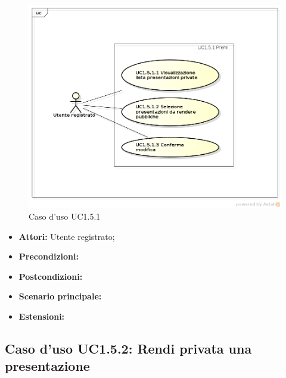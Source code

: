 \begin{figure}[h]
	\begin{center}
	\includegraphics[scale=0.4]{diagram/UC1-5-1.png}
	\caption{Caso d'uso UC1.5.1}
	\end{center}
\end{figure}

\begin{itemize}
	\item \textbf{Attori:} Utente registrato; 
	\item \textbf{Precondizioni:}
	\item \textbf{Postcondizioni:}
	\item \textbf{Scenario principale:}
	\item \textbf{Estensioni:}
\end{itemize}

\subsection{Caso d'uso UC1.5.2: Rendi privata una presentazione}

